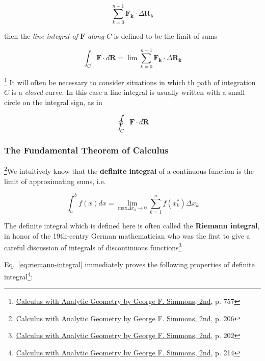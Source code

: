 \begin{equation}
    \sum_{k = 0}^{n - 1}\boldsymbol{F_k} \cdot \Delta\boldsymbol{R_k}
\end{equation}

then the \textit{line integral of} $\boldsymbol{F}$ \textit{along} $C$ is defined to be the limit of sums

\begin{equation}
    \int_{C} \boldsymbol{F} \cdot d\boldsymbol{R} = \lim \sum_{k = 0}^{n - 1}\boldsymbol{F_k} \cdot \Delta\boldsymbol{R_k}
\end{equation}

\begin{tcolorbox}[enhanced,arc=3mm,boxrule=1.5mm,
    frame hidden,colback=blue!10!white,
    borderline={1mm}{0mm}{blue,dotted}
]
    \footnote{\href{https://trello.com/c/byu9Pyy8}{Calculus with Analytic Geometry by George F. Simmons, 2nd}, p. 757} It
    will often be necessary to consider situations in which th path of integration $C$ is a \textit{closed} curve. In this
    case a line integral is usually written with a small circle on the integral sign, as in

    \[
        \oint_{C} \boldsymbol{F} \cdot d\boldsymbol{R}
    \]
\end{tcolorbox}

\subsubsection{The Fundamental Theorem of Calculus}

\footnote{\href{https://trello.com/c/byu9Pyy8}{Calculus with Analytic Geometry by George F. Simmons, 2nd}, p. 206}We
intuitively know that the \textbf{definite integral} of a continuous function is the limit of approximating sums, i.e.

\begin{equation}\label{eq:riemann-integral}
    \int_{a}^{b} f(x)dx = \lim\limits_{\text{max}\Delta x_k \rightarrow 0}\sum_{k = 1}^{n} f(x_k^*)\Delta x_k
\end{equation}

The definite integral which is defined here is often called the \textbf{Riemann integral}, in honor of the 19th-centry
German mathematician who was the first to give a careful discussion of integrals of discontinuous
functions\footnote{\href{https://trello.com/c/byu9Pyy8}{Calculus with Analytic Geometry by George F. Simmons, 2nd}, p. 202}

Eq.~\ref{eq:riemann-integral} immediately proves the following properties of definite integral\footnote{\href{https://trello.com/c/byu9Pyy8}{Calculus with Analytic Geometry by George F. Simmons, 2nd}, p. 214}:

